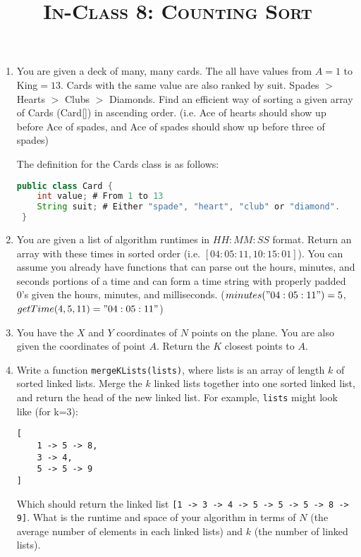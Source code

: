 \documentclass{article}
\title{\large{\textsc{In-Class 8: Counting Sort}}}
\date{}
\begin{document}
\maketitle

\subsection*{}

\begin{enumerate}

\item You are given a deck of many, many cards. The all have values from $A=1$ to King$=13$. Cards with the same value are also ranked by suit. Spades $>$ Hearts $>$ Clubs $>$ Diamonds. Find an efficient way of sorting a given array of Cards (Card[]) in ascending order. (i.e. Ace of hearts should show up before Ace of spades, and Ace of spades should show up before three of spades)

The definition for the Cards class is as follows:

\begin{lstlisting}[language=Java]
 public class Card {
    int value; # From 1 to 13
    String suit; # Either "spade", "heart", "club" or "diamond".
 }
\end{lstlisting}

\item You are given a list of algorithm runtimes in $HH:MM:SS$ format. Return an array with these times in sorted order (i.e. $[04:05:11,10:15:01]$). You can assume you already have functions that can parse out the hours, minutes, and seconds portions of a time and can form a time string with properly padded 0's given the hours, minutes, and milliseconds. ($minutes("04:05:11")=5$, $getTime(4,5,11)="04:05:11"$)
    
\item You have the $X$ and $Y$ coordinates of $N$ points on the plane. You are also given the coordinates of point $A$. Return the $K$ closest points to $A$.

\item Write a function \texttt{mergeKLists(lists)}, where lists is an array of length $k$ of sorted linked lists. Merge the $k$ linked lists together into one sorted linked list, and return the head of the new linked list. For example, \texttt{lists} might look like (for k=3): %

\begin{lstlisting}
[
    1 -> 5 -> 8,
    3 -> 4,
    5 -> 5 -> 9
]
\end{lstlisting}

Which should return the linked list \texttt{[1 -> 3 -> 4 -> 5 -> 5 -> 5 -> 8 -> 9]}. What is the runtime and space of your algorithm in terms of $N$ (the average number of elements in each linked lists) and $k$ (the number of linked lists).
\end{enumerate}
\end{document}
